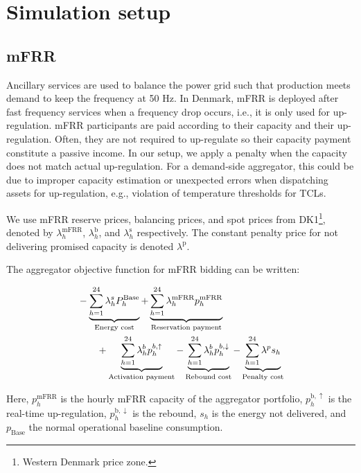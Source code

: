 \documentclass[lettersize,journal]{IEEEtran}
\begin{document}
\section{Simulation setup}

\subsection{mFRR}

Ancillary services are used to balance the power grid such that production meets demand to keep the frequency at 50 Hz. In Denmark, mFRR is deployed after fast frequency services when a frequency drop occurs, i.e., it is only used for up-regulation. mFRR participants are paid according to their capacity and their up-regulation. Often, they are not required to up-regulate so their capacity payment constitute a passive income. In our setup, we apply a penalty when the capacity does not match actual up-regulation. For a demand-side aggregator, this could be due to improper capacity estimation or unexpected errors when dispatching assets for up-regulation, e.g., violation of temperature thresholds for TCLs.

We use mFRR reserve prices, balancing prices, and spot prices from DK1\footnote{Western Denmark price zone.}, denoted by $\lambda_{h}^{\text{mFRR}}$, $\lambda_{h}^{\text{b}}$, and $\lambda_{h}^{\text{s}}$ respectively. The constant penalty price for not delivering promised capacity is denoted $\lambda^{\text{p}}$.

The aggregator objective function for mFRR bidding can be written:

\begin{align}\label{eq:mFRRObjective}
     & - \underbrace{\sum_{h=1}^{24} \lambda^{s}_{h}P^{\text{Base}}_{h}}_{\textrm{Energy cost}} + \underbrace{\sum_{h=1}^{24}\lambda_{h}^{\text{mFRR}} p^{\text{mFRR}}_{h}}_{\textrm{Reservation payment}}  \notag \\ & \quad \quad + \underbrace{\sum_{h=1}^{24}  \lambda_{h}^{b} p^{b,\uparrow}_{h}}_{\textrm{Activation payment}} - \underbrace{\sum_{h=1}^{24}  \lambda_{h}^{b} p^{b,\downarrow}_{h}}_{\textrm{Rebound cost}} - \underbrace{ \sum_{h=1}^{24}  \lambda^{p}s_{h}}_{\textrm{Penalty cost}}
\end{align}

Here, $p^{\text{mFRR}}_{h}$ is the hourly mFRR capacity of the aggregator portfolio, $p_{h}^{\text{b},\uparrow}$ is the real-time up-regulation, $p_{h}^{\text{b},\downarrow}$ is the rebound, $s_{h}$ is the energy not delivered, and $p_{\text{Base}}$ the normal operational baseline consumption.
\end{document}
